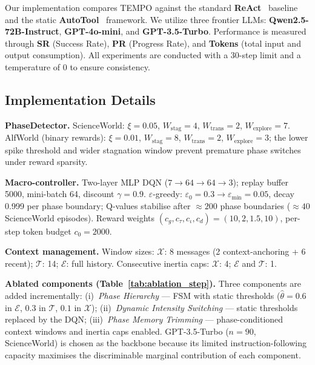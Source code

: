 \documentclass[runningheads]{llncs}
\begin{document}
Our implementation compares TEMPO against the standard \textbf{ReAct}~\cite{react} baseline and the static \textbf{AutoTool}~\cite{autotool} framework. We utilize three frontier LLMs: \textbf{Qwen2.5-72B-Instruct}, \textbf{GPT-4o-mini}, and \textbf{GPT-3.5-Turbo}. Performance is measured through \textbf{SR} (Success Rate), \textbf{PR} (Progress Rate), and \textbf{Tokens} (total input and output consumption). All experiments are conducted with a 30-step limit and a temperature of 0 to ensure consistency.

\subsection{Implementation Details}
\label{sec:impl}

\textbf{PhaseDetector.}
ScienceWorld: $\xi{=}0.05$, $W_{\mathrm{stag}}{=}4$, $W_{\mathrm{trans}}{=}2$, $W_{\mathrm{explore}}{=}7$.
AlfWorld (binary rewards): $\xi{=}0.01$, $W_{\mathrm{stag}}{=}8$, $W_{\mathrm{trans}}{=}2$, $W_{\mathrm{explore}}{=}3$; the lower spike threshold and wider stagnation window prevent premature phase switches under reward sparsity.

\textbf{Macro-controller.}
Two-layer MLP DQN ($7{\to}64{\to}64{\to}3$); replay buffer 5000, mini-batch 64, discount $\gamma{=}0.9$. $\varepsilon$-greedy: $\varepsilon_0{=}0.3\!\to\!\varepsilon_{\min}{=}0.05$, decay 0.999 per phase boundary; Q-values stabilise after ${\approx}200$ phase boundaries (${\approx}40$ ScienceWorld episodes). Reward weights $(c_g,c_\tau,c_\iota,c_d){=}(10,2,1.5,10)$, per-step token budget $c_0{=}2000$.

\textbf{Context management.}
Window sizes: $\mathcal{X}$: 8 messages (2 context-anchoring + 6 recent); $\mathcal{T}$: 14; $\mathcal{E}$: full history. Consecutive inertia caps: $\mathcal{X}$: 4; $\mathcal{E}$ and $\mathcal{T}$: 1.

\textbf{Ablated components (Table~\ref{tab:ablation_step}).}
Three components are added incrementally: (i)~\emph{Phase Hierarchy} — FSM with static thresholds ($\hat\theta{=}0.6$ in $\mathcal{E}$, $0.3$ in $\mathcal{T}$, $0.1$ in $\mathcal{X}$); (ii)~\emph{Dynamic Intensity Switching} — static thresholds replaced by the DQN; (iii)~\emph{Phase Memory Trimming} — phase-conditioned context windows and inertia caps enabled. GPT-3.5-Turbo ($n{=}90$, ScienceWorld) is chosen as the backbone because its limited instruction-following capacity maximises the discriminable marginal contribution of each component.
\end{document}
